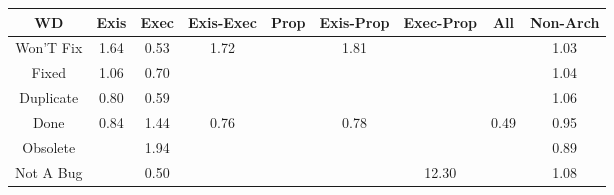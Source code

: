 \begin{tabular}{|c||c|c|c|c|c|c|c|c|}
\hline
\hline
WD & Exis & Exec & Exis-Exec & Prop & Exis-Prop & Exec-Prop & All & Non-Arch \\ 
\hline
Won'T Fix & \cellcolor[rgb]{0.8885744925942147,0.8298510754393648,0.42} 1.64 & \cellcolor[rgb]{0.8333591773367974,0.47723343939417395,0.34846856551434413} 0.53 & \cellcolor[rgb]{0.8857471585424339,0.8285118119411529,0.42} 1.72 &  & \cellcolor[rgb]{0.8826256968156029,0.8270332248073907,0.42} 1.81 &  &  & \cellcolor[rgb]{0.9090787135209382,0.839563601141497,0.42} 1.03 \\ 
\hline
Fixed & \cellcolor[rgb]{0.9080423087482277,0.8390726725649499,0.42} 1.06 & \cellcolor[rgb]{0.8612015520513991,0.6090206797099558,0.37445478191463916} 0.70 &  &  &  &  &  & \cellcolor[rgb]{0.9087564667501441,0.8394109579342788,0.42} 1.04 \\ 
\hline
Duplicate & \cellcolor[rgb]{0.8773591471067239,0.6854999629718265,0.3895352039662756} 0.80 & \cellcolor[rgb]{0.8425334879286215,0.5206585095288087,0.35703125540004677} 0.59 &  &  &  &  &  & \cellcolor[rgb]{0.9079335579966825,0.8390211590510601,0.42} 1.06 \\ 
\hline
Done & \cellcolor[rgb]{0.8843275216308386,0.7184836023859692,0.3960390201887827} 0.84 & \cellcolor[rgb]{0.8953191137909685,0.8330458960062482,0.42} 1.44 & \cellcolor[rgb]{0.8706074604986691,0.6535419796937001,0.38323362979875775} 0.76 &  & \cellcolor[rgb]{0.8741251027631205,0.6701921530787703,0.38651676257891243} 0.78 &  & \cellcolor[rgb]{0.8252889071491097,0.43903416050578603,0.3409363133391691} 0.49 & \cellcolor[rgb]{0.9017426278372375,0.8009151050962574,0.41229311931475493} 0.95 \\ 
\hline
Obsolete &  & \cellcolor[rgb]{0.8783128617495191,0.8249903029339826,0.42} 1.94 &  &  &  &  &  & \cellcolor[rgb]{0.8923352350928118,0.7563867794393089,0.4035128860866243} 0.89 \\ 
\hline
Not A Bug &  & \cellcolor[rgb]{0.8282631050120723,0.45311203039047543,0.3437122313446008} 0.50 &  &  &  & \cellcolor[rgb]{0.53,0.66,0.42} 12.30 &  & \cellcolor[rgb]{0.9073984717374454,0.8387676971387898,0.42} 1.08 \\ 
\hline
\end{tabular}